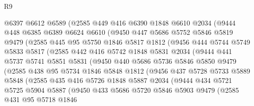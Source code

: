 \begin{lexlean}{R9}
\begin{coremodule}
        @6397
        @6612
        @6589
        (@2585
          @449
          @416
          @6390
          @1848
          @6610
          @2034
          (@9444
            @448
            @6385
            @6389
            @6624
            @6610
            (@9450
              @447
              @5686
              @5752
              @5846
              @5819
              @9479
              (@2585
                @445
                @95
                @5750
                @1846
                @5817
                @1812
                (@9456
                  @444
                  @5744
                  @5749
                  @5833
                  @5817
                  (@2585
                    @442
                    @416
                    @5742
                    @1848
                    @5831
                    @2034
                    (@9444
                      @441
                      @5737
                      @5741
                      @5851
                      @5831
                      (@9450
                        @440
                        @5686
                        @5736
                        @5846
                        @5850
                        @9479
                        (@2585
                          @438
                          @95
                          @5734
                          @1846
                          @5848
                          @1812
                          (@9456
                            @437
                            @5728
                            @5733
                            @5889
                            @5848
                            (@2585
                              @435
                              @416
                              @5726
                              @1848
                              @5887
                              @2034
                              (@9444
                                @434
                                @5721
                                @5725
                                @5904
                                @5887
                                (@9450
                                  @433
                                  @5686
                                  @5720
                                  @5846
                                  @5903
                                  @9479
                                  (@2585
                                    @431
                                    @95
                                    @5718
                                    @1846

\end{coremodule}
\end{lexlean}

